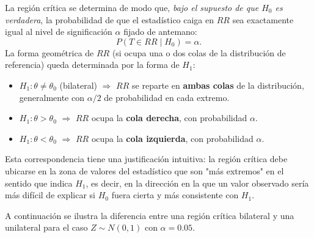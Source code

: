 \documentclass[11pt,a4paper]{article}
\theoremstyle{plain}
\theoremstyle{definition}
\theoremstyle{remark}
\begin{document}
La región crítica se determina de modo que, \emph{bajo el supuesto de que $H_0$ es verdadera}, la probabilidad de que el estadístico caiga en $RR$ sea exactamente igual al nivel de significación $\alpha$ fijado de antemano:
\[
P(T\in RR\mid H_0) = \alpha.
\]
La forma geométrica de $RR$ (si ocupa una o dos colas de la distribución de referencia) queda determinada por la forma de $H_1$:

\begin{itemize}[nosep]
\item $H_1:\theta\neq\theta_0$ (bilateral) $\Rightarrow$ $RR$ se reparte en \textbf{ambas colas} de la distribución, generalmente con $\alpha/2$ de probabilidad en cada extremo.
\item $H_1:\theta>\theta_0$ $\Rightarrow$ $RR$ ocupa la \textbf{cola derecha}, con probabilidad $\alpha$.
\item $H_1:\theta<\theta_0$ $\Rightarrow$ $RR$ ocupa la \textbf{cola izquierda}, con probabilidad $\alpha$.
\end{itemize}

Esta correspondencia tiene una justificación intuitiva: la región crítica debe ubicarse en la zona de valores del estadístico que son "más extremos" en el sentido que indica $H_1$, es decir, en la dirección en la que un valor observado sería más difícil de explicar si $H_0$ fuera cierta y más consistente con $H_1$.

A continuación se ilustra la diferencia entre una región crítica bilateral y una unilateral para el caso $Z\sim N(0,1)$ con $\alpha=0.05$.

\begin{center}
\hspace{0.4cm}
\end{center}
\end{document}
